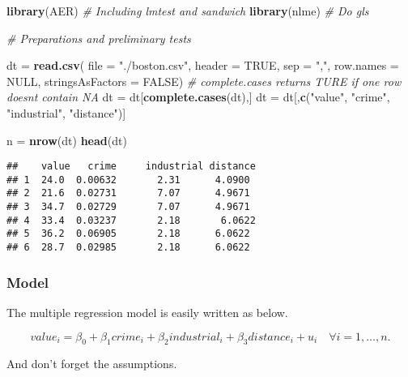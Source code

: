\documentclass[
  12pt,
]{article}
\newenvironment{Shaded}{\begin{snugshade}}{\end{snugshade}}
\newcommand{\CommentTok}[1]{\textcolor[rgb]{0.56,0.35,0.01}{\textit{#1}}}
\newcommand{\DataTypeTok}[1]{\textcolor[rgb]{0.13,0.29,0.53}{#1}}
\newcommand{\KeywordTok}[1]{\textcolor[rgb]{0.13,0.29,0.53}{\textbf{#1}}}
\newcommand{\NormalTok}[1]{#1}
\newcommand{\OtherTok}[1]{\textcolor[rgb]{0.56,0.35,0.01}{#1}}
\newcommand{\StringTok}[1]{\textcolor[rgb]{0.31,0.60,0.02}{#1}}
\begin{document}
\begin{Shaded}
\begin{Highlighting}[]
\KeywordTok{library}\NormalTok{(AER) }\CommentTok{\# Including lmtest and sandwich}
\KeywordTok{library}\NormalTok{(nlme) }\CommentTok{\# Do gls}

\CommentTok{\# Preparations and preliminary tests}

\NormalTok{dt =}\StringTok{ }\KeywordTok{read.csv}\NormalTok{(}
\DataTypeTok{file =} \StringTok{"./boston.csv"}\NormalTok{,}
\DataTypeTok{header =} \OtherTok{TRUE}\NormalTok{, }\DataTypeTok{sep =} \StringTok{","}\NormalTok{, }\DataTypeTok{row.names =} \OtherTok{NULL}\NormalTok{, }\DataTypeTok{stringsAsFactors =} \OtherTok{FALSE}\NormalTok{)}
\CommentTok{\# complete.cases returns TURE if one row doesn\textquotesingle{}t contain NA}
\NormalTok{dt =}\StringTok{ }\NormalTok{dt[}\KeywordTok{complete.cases}\NormalTok{(dt),] }
\NormalTok{dt =}\StringTok{ }\NormalTok{dt[,}\KeywordTok{c}\NormalTok{(}\StringTok{"value"}\NormalTok{, }\StringTok{"crime"}\NormalTok{, }\StringTok{"industrial"}\NormalTok{, }\StringTok{"distance"}\NormalTok{)]}

\NormalTok{n =}\StringTok{ }\KeywordTok{nrow}\NormalTok{(dt)}
\KeywordTok{head}\NormalTok{(dt)}
\end{Highlighting}
\end{Shaded}

\begin{verbatim}
##    value   crime     industrial distance
## 1  24.0  0.00632       2.31      4.0900
## 2  21.6  0.02731       7.07      4.9671
## 3  34.7  0.02729       7.07      4.9671
## 4  33.4  0.03237       2.18       6.0622
## 5  36.2  0.06905       2.18      6.0622
## 6  28.7  0.02985       2.18      6.0622
\end{verbatim}

\hypertarget{model-5}{%
\subsubsection{Model}\label{model-5}}

The multiple regression model is easily written as below.

\[
value_i = \beta_0 + \beta_1 crime_i + \beta_2 industrial_i + \beta_3 distance_i + u_i \quad \forall i = 1, \dots, n.
\]

And don't forget the assumptions.
\end{document}
